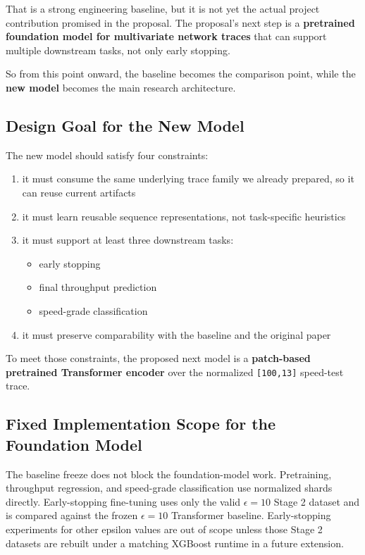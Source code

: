 \documentclass[11pt]{article}
\begin{document}
That is a strong engineering baseline, but it is not yet the actual project contribution promised in the proposal. The proposal's next step is a \textbf{pretrained foundation model for multivariate network traces} that can support multiple downstream tasks, not only early stopping.

So from this point onward, the baseline becomes the comparison point, while the \textbf{new model} becomes the main research architecture.

\subsection{Design Goal for the New Model}

The new model should satisfy four constraints:
\begin{enumerate}
\item it must consume the same underlying trace family we already prepared, so it can reuse current artifacts
\item it must learn reusable sequence representations, not task-specific heuristics
\item it must support at least three downstream tasks:
  \begin{itemize}
  \item early stopping
  \item final throughput prediction
  \item speed-grade classification
  \end{itemize}
\item it must preserve comparability with the baseline and the original paper
\end{enumerate}

To meet those constraints, the proposed next model is a \textbf{patch-based pretrained Transformer encoder} over the normalized \texttt{[100,13]} speed-test trace.

\subsection{Fixed Implementation Scope for the Foundation Model}

The baseline freeze does not block the foundation-model work. Pretraining, throughput regression, and speed-grade classification use normalized shards directly. Early-stopping fine-tuning uses only the valid \(\epsilon = 10\) Stage 2 dataset and is compared against the frozen \(\epsilon = 10\) Transformer baseline. Early-stopping experiments for other epsilon values are out of scope unless those Stage 2 datasets are rebuilt under a matching XGBoost runtime in a future extension.
\end{document}
